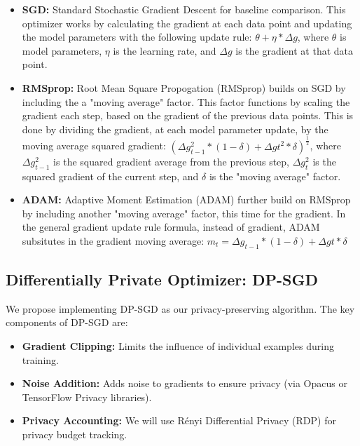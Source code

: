 \documentclass{article}
\begin{document}
    \begin{itemize}
        \item \textbf{SGD:} Standard Stochastic Gradient Descent for baseline comparison. This optimizer works by calculating the gradient at each data
        point and updating the model parameters with the following update rule: $\theta + \eta * \Delta g$, where $\theta$ is model parameters, $\eta$ is
        the learning rate, and $\Delta g$ is the gradient at that data point.
        \item \textbf{RMSprop:} Root Mean Square Propogation (RMSprop) builds on SGD by including the a "moving average" factor. This factor functions by scaling the gradient
        each step, based on the gradient of the previous data points. This is done by dividing the gradient, at each model parameter update,
        by the moving average squared gradient: $(\Delta g_{t-1}^{2} * (1-\delta) + \Delta g{t}^{2}*\delta)^{\frac{1}{2}}$,
        where $\Delta g_{t-1}^{2}$ is the squared gradient average from the previous step, $\Delta g_{t}^{2}$ is the squared gradient of the current step, and $\delta$ is the "moving average" factor. \cite{DBLP:journals/corr/abs-1807-06766} \cite{Jason_Huang_2020}
        \item \textbf{ADAM:} Adaptive Moment Estimation (ADAM) further build on RMSprop by including another "moving average" factor, this time for the gradient. In the general gradient update rule formula, instead of gradient,
        ADAM subsitutes in the gradient moving average: $m_{t} = \Delta g_{t-1} * (1-\delta) + \Delta g{t}*\delta$ \cite{DBLP:journals/corr/abs-1807-06766}
    \end{itemize}

    \subsection{Differentially Private Optimizer: DP-SGD}\label{subsec:differentially-private-optimizer:-dp-sgd}
    We propose implementing DP-SGD as our privacy-preserving algorithm.
    The key components of DP-SGD are:
    \begin{itemize}
        \item \textbf{Gradient Clipping:} Limits the influence of individual examples during training.
        \item \textbf{Noise Addition:} Adds noise to gradients to ensure privacy (via Opacus or TensorFlow Privacy libraries).
        \item \textbf{Privacy Accounting:} We will use Rényi Differential Privacy (RDP) for privacy budget tracking.
    \end{itemize}
\end{document}
